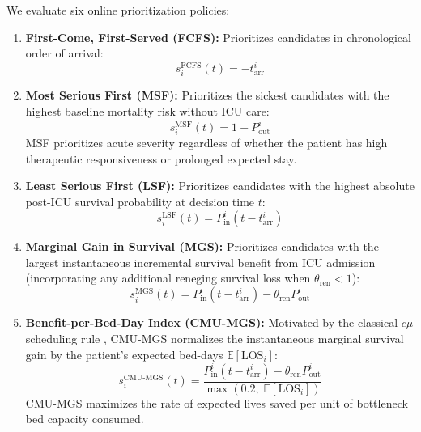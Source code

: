 \documentclass[final,5p,times,twocolumn]{elsarticle}
\begin{document}
We evaluate six online prioritization policies:
\begin{enumerate}
    \item \textbf{First-Come, First-Served (FCFS):}
    Prioritizes candidates in chronological order of arrival:
    \begin{equation}
        s_i^{\text{FCFS}}(t) = -t_{\text{arr}}^i
        \label{eq:fcfs}
    \end{equation}

    \item \textbf{Most Serious First (MSF):}
    Prioritizes the sickest candidates with the highest baseline mortality risk without ICU care:
    \begin{equation}
        s_i^{\text{MSF}}(t) = 1 - P_{\text{out}}^i
        \label{eq:msf}
    \end{equation}
    MSF prioritizes acute severity regardless of whether the patient has high therapeutic responsiveness or prolonged expected stay.

    \item \textbf{Least Serious First (LSF):}
    Prioritizes candidates with the highest absolute post-ICU survival probability at decision time $t$:
    \begin{equation}
        s_i^{\text{LSF}}(t) = P_{\text{in}}^i(t - t_{\text{arr}}^i)
        \label{eq:lsf}
    \end{equation}

    \item \textbf{Marginal Gain in Survival (MGS):}
    Prioritizes candidates with the largest instantaneous incremental survival benefit from ICU admission (incorporating any additional reneging survival loss when $\theta_{\text{ren}} < 1$):
    \begin{equation}
        s_i^{\text{MGS}}(t) = P_{\text{in}}^i(t - t_{\text{arr}}^i) - \theta_{\text{ren}} P_{\text{out}}^i
        \label{eq:mgs}
    \end{equation}

    \item \textbf{Benefit-per-Bed-Day Index (CMU-MGS):}
    Motivated by the classical $c\mu$ scheduling rule \cite{buyukkoc1985cmu, mills2013resource}, CMU-MGS normalizes the instantaneous marginal survival gain by the patient's expected bed-days $\mathbb{E}[\text{LOS}_i]$:
    \begin{equation}
        s_i^{\text{CMU-MGS}}(t) = \frac{P_{\text{in}}^i(t - t_{\text{arr}}^i) - \theta_{\text{ren}} P_{\text{out}}^i}{\max\left(0.2,\; \mathbb{E}[\text{LOS}_i]\right)}
        \label{eq:cmu_mgs}
    \end{equation}
    CMU-MGS maximizes the rate of expected lives saved per unit of bottleneck bed capacity consumed.


\end{enumerate}
\end{document}
